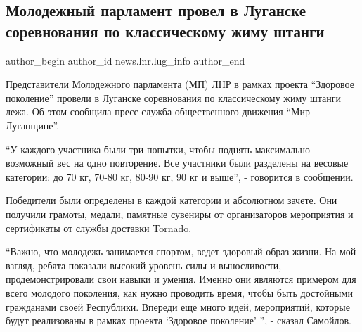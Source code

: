  
 
 
 
 
 
\subsection{Молодежный парламент провел в Луганске соревнования по классическому жиму штанги}
\label{sec:13_02_2022.stz.news.lnr.lug_info.1.molodezh_parlament_sorev_lugansk}
 
\ifcmt
 author_begin
   author_id news.lnr.lug_info
 author_end
\fi

Представители Молодежного парламента (МП) ЛНР в рамках проекта \enquote{Здоровое
поколение} провели в Луганске соревнования по классическому жиму штанги лежа.
Об этом сообщила пресс-служба общественного движения \enquote{Мир Луганщине}.


\enquote{У каждого участника были три попытки, чтобы поднять максимально возможный вес
на одно повторение. Все участники были разделены на весовые категории: до 70
кг, 70-80 кг, 80-90 кг, 90 кг и выше}, - говорится в сообщении.


Победители были определены в каждой категории и абсолютном зачете. Они получили
грамоты, медали, памятные сувениры от организаторов мероприятия и сертификаты
от службы доставки Tornado.

\enquote{Важно, что молодежь занимается спортом, ведет здоровый образ жизни. На
мой взгляд, ребята показали высокий уровень силы и выносливости,
продемонстрировали свои навыки и умения. Именно они являются примером для всего
молодого поколения, как нужно проводить время, чтобы быть достойными гражданами
своей Республики. Впереди еще много идей, мероприятий, которые будут
реализованы в рамках проекта \enquote{Здоровое поколение} }, - сказал Самойлов.
